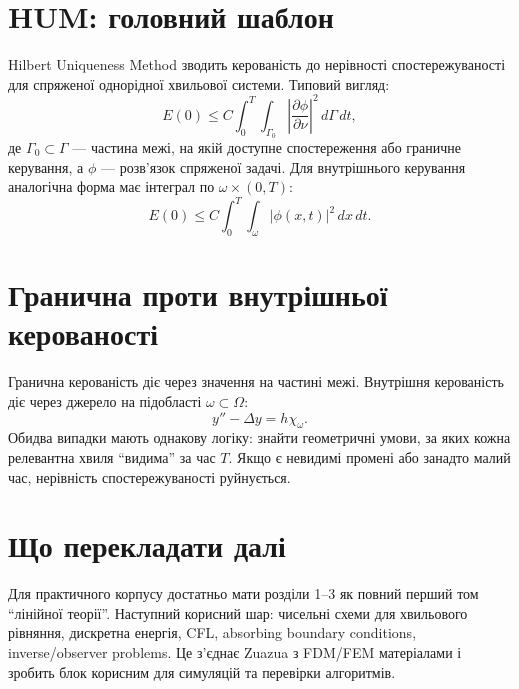 \section{HUM: головний шаблон}

Hilbert Uniqueness Method зводить керованість до нерівності спостережуваності для спряженої однорідної хвильової системи. Типовий вигляд:
\begin{equation}
  E(0) \le C \int_0^T \int_{\Gamma_0} \left|\frac{\partial \phi}{\partial \nu}\right|^2\,d\Gamma\,dt,
\end{equation}
де $\Gamma_0\subset\Gamma$ --- частина межі, на якій доступне спостереження або граничне керування, а $\phi$ --- розв'язок спряженої задачі. Для внутрішнього керування аналогічна форма має інтеграл по $\omega\times(0,T)$:
\begin{equation}
  E(0) \le C \int_0^T\int_{\omega}|\phi(x,t)|^2\,dx\,dt.
\end{equation}

\section{Гранична проти внутрішньої керованості}

Гранична керованість діє через значення на частині межі. Внутрішня керованість діє через джерело на підобласті $\omega\subset\Omega$:
\begin{equation}
 y''-\Delta y=h\chi_\omega.
\end{equation}
Обидва випадки мають однакову логіку: знайти геометричні умови, за яких кожна релевантна хвиля ``видима'' за час $T$. Якщо є невидимі промені або занадто малий час, нерівність спостережуваності руйнується.

\section{Що перекладати далі}

Для практичного корпусу достатньо мати розділи 1--3 як повний перший том ``лінійної теорії''. Наступний корисний шар: чисельні схеми для хвильового рівняння, дискретна енергія, CFL, absorbing boundary conditions, inverse/observer problems. Це з'єднає Zuazua з FDM/FEM матеріалами і зробить блок корисним для симуляцій та перевірки алгоритмів.
